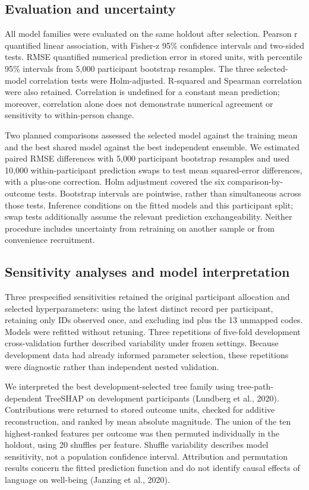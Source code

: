 \documentclass[11pt,letterpaper]{article}
\begin{document}
\subsection{Evaluation and uncertainty}\label{evaluation-and-uncertainty}

All model families were evaluated on the same holdout after selection. Pearson r quantified linear association, with Fisher-z 95\% confidence intervals and two-sided tests. RMSE quantified numerical prediction error in stored units, with percentile 95\% intervals from 5,000 participant bootstrap resamples. The three selected-model correlation tests were Holm-adjusted. R-squared and Spearman correlation were also retained. Correlation is undefined for a constant mean prediction; moreover, correlation alone does not demonstrate numerical agreement or sensitivity to within-person change.

Two planned comparisons assessed the selected model against the training mean and the best shared model against the best independent ensemble. We estimated paired RMSE differences with 5,000 participant bootstrap resamples and used 10,000 within-participant prediction swaps to test mean squared-error differences, with a plus-one correction. Holm adjustment covered the six comparison-by-outcome tests. Bootstrap intervals are pointwise, rather than simultaneous across those tests. Inference conditions on the fitted models and this participant split; swap tests additionally assume the relevant prediction exchangeability. Neither procedure includes uncertainty from retraining on another sample or from convenience recruitment.

\subsection{Sensitivity analyses and model interpretation}\label{sensitivity-analyses-and-model-interpretation}

Three prespecified sensitivities retained the original participant allocation and selected hyperparameters: using the latest distinct record per participant, retaining only IDs observed once, and excluding ind plus the 13 unmapped codes. Models were refitted without retuning. Three repetitions of five-fold development cross-validation further described variability under frozen settings. Because development data had already informed parameter selection, these repetitions were diagnostic rather than independent nested validation.

We interpreted the best development-selected tree family using tree-path-dependent TreeSHAP on development participants (Lundberg et al., 2020). Contributions were returned to stored outcome units, checked for additive reconstruction, and ranked by mean absolute magnitude. The union of the ten highest-ranked features per outcome was then permuted individually in the holdout, using 20 shuffles per feature. Shuffle variability describes model sensitivity, not a population confidence interval. Attribution and permutation results concern the fitted prediction function and do not identify causal effects of language on well-being (Janzing et al., 2020).
\end{document}
